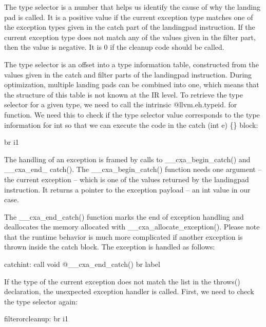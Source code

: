 The type selector is a number that helps us identify the cause of why the landing pad is called. It is a positive value if the current exception type matches one of the exception types given in the catch part of the landingpad instruction. If the current exception type does not match any of the values given in the filter part, then the value is negative. It is 0 if the cleanup code should be called.

The type selector is an offset into a type information table, constructed from the values given in the catch and filter parts of the landingpad instruction. During optimization, multiple landing pads can be combined into one, which means that the structure of this table is not known at the IR level. To retrieve the type selector for a given type, we need to call the intrinsic @llvm.eh.typeid. for function. We need this to check if the type selector value corresponds to the type information for int so that we can execute the code in the catch (int e) \{\} block:

\begin{shell}
br i1 %
\end{shell}

The handling of an exception is framed by calls to \_\_cxa\_begin\_catch() and \_\_cxa\_end\_ catch(). The \_\_cxa\_begin\_catch() function needs one argument – the current exception – which is one of the values returned by the landingpad instruction. It returns a pointer to the exception payload – an int value in our case.

The \_\_cxa\_end\_catch() function marks the end of exception handling and deallocates the memory allocated with \_\_cxa\_allocate\_exception(). Please note that the runtime behavior is much more complicated if another exception is thrown inside the catch block. The exception is handled as follows:

\begin{shell}
catchint:
call void @__cxa_end_catch()
br label %
\end{shell}

If the type of the current exception does not match the list in the throws() declaration, the unexpected exception handler is called. First, we need to check the type selector again:

\begin{shell}
filterorcleanup:
br i1 %
\end{shell}

